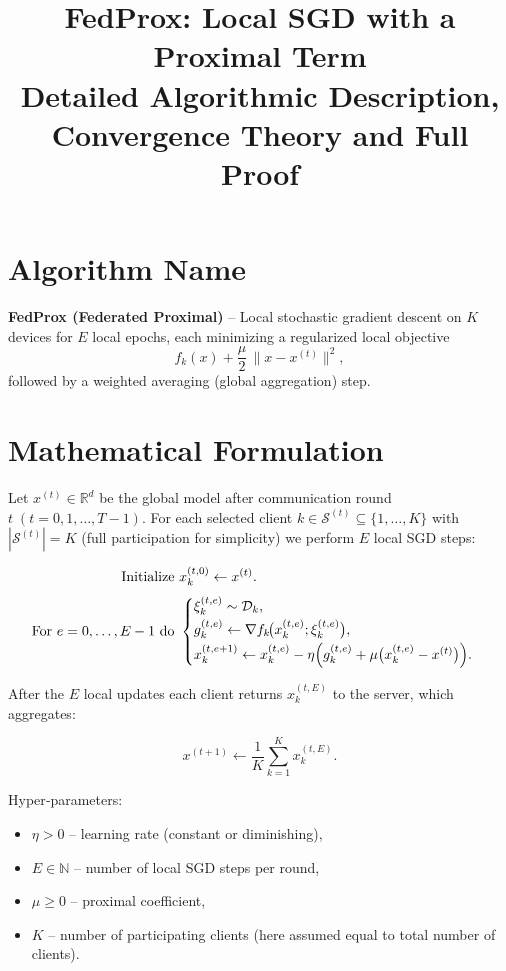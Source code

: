 \documentclass[11pt]{article}
\newcommand{\R}{\mathbb{R}}
\begin{document}
\title{FedProx: Local SGD with a Proximal Term \\ Detailed Algorithmic Description, Convergence Theory and Full Proof}
\author{}
\date{}
\maketitle

\section*{Algorithm Name}
\textbf{FedProx (Federated Proximal)} – Local stochastic gradient descent on $K$ devices for $E$ local epochs, each minimizing a regularized local objective 
\[
f_k(x) + \frac{\mu}{2}\,\|x - x^{(t)}\|^2 ,
\]
followed by a weighted averaging (global aggregation) step.

\section*{Mathematical Formulation}
Let $x^{(t)}\in\R^{d}$ be the global model after communication round $t\;(t=0,1,\dots,T-1)$.  
For each selected client $k\in\mathcal{S}^{(t)}\subseteq\{1,\dots,K\}$ with $|\mathcal{S}^{(t)}|=K$ (full participation for simplicity) we perform $E$ local SGD steps:

\[
\begin{aligned}
\text{Initialize }&x_{k}^{(t,0)} \gets x^{(t)} .\\[0.3em]
\text{For }e =0,\dots,E-1 \text{ do } &
\begin{cases}
\displaystyle \xi_{k}^{(t,e)} \sim \mathcal{D}_k ,\\[0.2em]
g_{k}^{(t,e)} \gets \nabla f_k\!\bigl(x_{k}^{(t,e)};\xi_{k}^{(t,e)}\bigr),\\[0.2em]
x_{k}^{(t,e+1)} \gets x_{k}^{(t,e)} - \eta \Bigl(g_{k}^{(t,e)} + \mu\bigl(x_{k}^{(t,e)}-x^{(t)}\bigr)\Bigr).
\end{cases}
\end{aligned}
\]

After the $E$ local updates each client returns $x_{k}^{(t,E)}$ to the server, which aggregates:

\[
x^{(t+1)} \gets \frac{1}{K}\sum_{k=1}^{K} x_{k}^{(t,E)} .
\]

Hyper‑parameters:
\begin{itemize}[noitemsep]
\item $\eta>0$ – learning rate (constant or diminishing),
\item $E\in\mathbb{N}$ – number of local SGD steps per round,
\item $\mu\ge 0$ – proximal coefficient,
\item $K$ – number of participating clients (here assumed equal to total number of clients).
\end{itemize}
\end{document}
